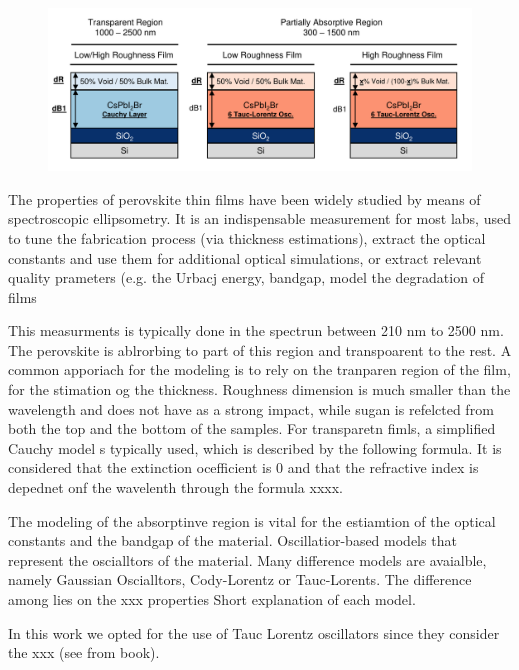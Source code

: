 \begin{figure}{}
  \centering
  \medskip
  \includegraphics[width=.95\textwidth]{chapters/ellipsometry/image/Model_Approach.pdf}
  \caption{}
  \label{fig:ellipsometry:static_models}
\end{figure}




The properties of perovskite thin films have been widely studied by means of spectroscopic ellipsometry. It is an indispensable measurement for most labs, used to tune the fabrication process (via thickness estimations), extract the optical constants and use them for additional optical simulations, or extract relevant quality prameters (e.g. the Urbacj energy, bandgap, model the degradation of films 




 This measurments is typically done in the spectrun between 210 nm to 2500 nm. The perovskite is ablrorbing to part of this region and transpoarent to the rest. A common apporiach for the modeling is to rely on the tranparen region of the film, for the stimation og the thickness. Roughness dimension is much smaller than the wavelength and does not have as a strong impact, while sugan is refelcted from both the top and the bottom of the samples. For transparetn fimls, a simplified Cauchy model s typically used, which is described by the following formula. It is considered that the extinction ocefficient is 0 and that the refractive index is depednet onf the wavelenth through the formula xxxx. 

The modeling of the absorptinve region is vital for the estiamtion of the optical constants and the bandgap of the material. Oscillatior-based models that represent the oscialltors of the material. Many difference models are avaialble, namely Gaussian Oscialltors, Cody-Lorentz or Tauc-Lorents. The difference among lies on the xxx properties Short explanation of each model. 

In this work we opted for the use of Tauc Lorentz oscillators since they consider the xxx (see from book). 

